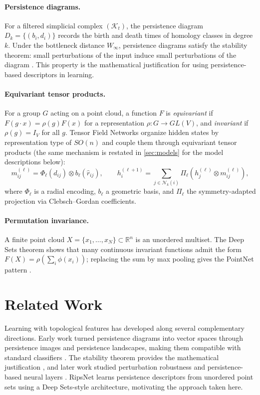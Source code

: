 \documentclass[a4paper,11pt]{article}
\begin{document}
\paragraph{Persistence diagrams.}
For a filtered simplicial complex $(\mathcal K_t)$, the persistence diagram $D_k=\{(b_i,d_i)\}$ records the birth and death times of homology classes in degree $k$.
Under the bottleneck distance $W_\infty$, persistence diagrams satisfy the stability theorem: small perturbations of the input induce small perturbations of the diagram \cite{persistence_stability2007}.
This property is the mathematical justification for using persistence-based descriptors in learning.

\paragraph{Equivariant tensor products.}
For a group $G$ acting on a point cloud, a function $F$ is \emph{equivariant} if $F(g\cdot x)=\rho(g)F(x)$ for a representation $\rho:G\to GL(V)$, and \emph{invariant} if $\rho(g)=I_V$ for all $g$.
Tensor Field Networks \cite{tfn2018} organize hidden states by representation type of $SO(n)$ and couple them through equivariant tensor products (the same mechanism is restated in \cref{sec:models} for the model descriptions below):
\[
m_{ij}^{(\ell)} = \Phi_\ell(d_{ij}) \otimes b_\ell(\hat r_{ij}),
\qquad
h_i^{(\ell+1)} = \sum_{j\in\mathcal N_k(i)} \Pi_\ell\!\left(h_j^{(\ell)} \otimes m_{ij}^{(\ell)}\right),
\]
where $\Phi_\ell$ is a radial encoding, $b_\ell$ a geometric basis, and $\Pi_\ell$ the symmetry-adapted projection via Clebsch--Gordan coefficients.

\paragraph{Permutation invariance.}
A finite point cloud $X=\{x_1,\dots,x_N\}\subset \mathbb R^n$ is an unordered multiset.
The Deep Sets theorem \cite{deepsets2017} shows that many continuous invariant functions admit the form $F(X)=\rho(\sum_i \phi(x_i))$; replacing the sum by max pooling gives the PointNet pattern \cite{pointnet2017}.

\section{Related Work} \label{sec:related}

Learning with topological features has developed along several complementary directions.
Early work turned persistence diagrams into vector spaces through persistence images and persistence landscapes, making them compatible with standard classifiers \cite{persistenceimages2017,persistencelandscapes2015}.
The stability theorem provides the mathematical justification \cite{persistence_stability2007}, and later work studied perturbation robustness and persistence-based neural layers \cite{carriere2020perslay,kim2020pllay,som2018perturbation,carriere2017optimizingph}.
RipsNet \cite{surrel2022ripsnet} learns persistence descriptors from unordered point sets using a Deep Sets-style architecture, motivating the approach taken here.
\end{document}
